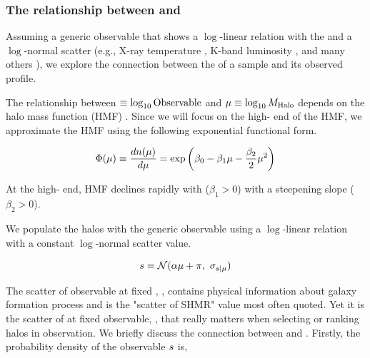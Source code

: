 \documentclass[fleqn,usenatbib,useAMS,english]{mnras}
\begin{document}
\subsubsection{The relationship between \scatterMhaloObsSym{} and \scatterObsSymMhalo{}}
    \label{sec:comp_scatters}

    Assuming a generic observable that shows a $\log$-linear relation with the \mvir{} and
    a $\log$-normal scatter (e.g.,
    X-ray temperature \citealt{Lieu2016}, K-band luminosity \citealt{Ziparo2016}, and many others
    \citealt{Evrard2014, Farahi2018}), we explore the connection between the \sigmh{} of a sample
    and its observed \dsigma{} profile.

    The relationship between \obsSym{}$\equiv \log_{10}{\rm Observable}$ and
    $\mu \equiv \log_{10}M_{\rm Halo}$ depends on the halo mass function (HMF)
    \citep[\eg{}][]{Tinker2008}.
    Since we will focus on the high-\mhalo{} end of the HMF, we approximate the HMF using the
    following exponential functional form.

    \begin{equation}
        \Phi(\mu){} \equiv \frac{dn(\mu)}{d\mu{}}  = \exp \left(\beta_0 - \beta_1 \mu - \frac{\beta_2}{2} \mu^2 \right)
        \label{eq:quadratic_hmf}
    \end{equation}

    \noindent At the high-\mhalo{} end, HMF declines rapidly with \mhalo{} ($\beta_1 > 0$) with a
    steepening slope ($\beta_2 > 0$).

    We populate the halos with the generic observable using a $\log$-linear relation with a
    constant $\log$-normal scatter value.

    \begin{equation}
        s = \mathcal{N}(\alpha \mu + \pi,\ \sigma_{s{} | \mu{}})
        \label{eq:lognormal_obs_given_mhalo}
    \end{equation}

    The scatter of observable at fixed \mhalo{}, \scatterObsSymMhalo{}, contains physical
    information about galaxy formation process and is the "scatter of SHMR" value most often
    quoted.
    Yet it is the scatter of \mhalo{} at fixed observable, \scatterMhaloObsSym{}, that really
    matters when selecting or ranking halos in observation.
    We briefly discuss the connection between \scatterObsSymMhalo{} and \scatterObsSymMhalo{}.
    Firstly, the probability density of the observable $s$ is,
\end{document}
